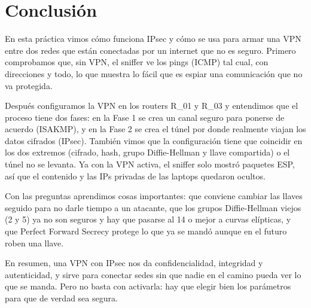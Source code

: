 \section{Conclusión}

En esta práctica vimos cómo funciona IPsec y cómo se usa para armar una VPN
entre dos redes que están conectadas por un internet que no es seguro. Primero
comprobamos que, sin VPN, el sniffer ve los pings (ICMP) tal cual, con
direcciones y todo, lo que muestra lo fácil que es espiar una comunicación que
no va protegida.

Después configuramos la VPN en los routers R\_01 y R\_03 y entendimos que el
proceso tiene dos fases: en la Fase 1 se crea un canal seguro para ponerse de
acuerdo (ISAKMP), y en la Fase 2 se crea el túnel por donde realmente viajan los
datos cifrados (IPsec). También vimos que la configuración tiene que coincidir en
los dos extremos (cifrado, hash, grupo Diffie-Hellman y llave compartida) o el
túnel no se levanta. Ya con la VPN activa, el sniffer solo mostró paquetes ESP,
así que el contenido y las IPs privadas de las laptops quedaron ocultos.

Con las preguntas aprendimos cosas importantes: que conviene cambiar las llaves
seguido para no darle tiempo a un atacante, que los grupos Diffie-Hellman viejos
(2 y 5) ya no son seguros y hay que pasarse al 14 o mejor a curvas elípticas, y
que Perfect Forward Secrecy protege lo que ya se mandó aunque en el futuro
roben una llave.

En resumen, una VPN con IPsec nos da confidencialidad, integridad y autenticidad,
y sirve para conectar sedes sin que nadie en el camino pueda ver lo que se
manda. Pero no basta con activarla: hay que elegir bien los parámetros para que
de verdad sea segura.
